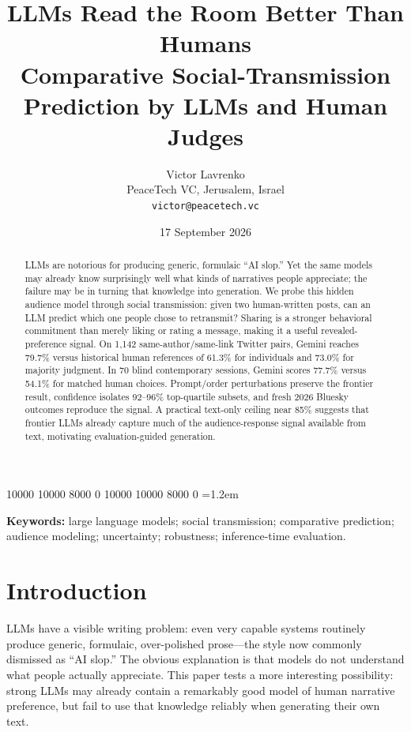 \documentclass[10pt,twocolumn]{article}
\title{\textbf{LLMs Read the Room Better Than Humans}\\\large Comparative Social-Transmission Prediction by LLMs and Human Judges}
\author{Victor Lavrenko\\
\small PeaceTech VC, Jerusalem, Israel\\
\small \texttt{victor@peacetech.vc}}
\date{17 September 2026}
\begin{document}
\raggedbottom
{} 10000 10000 8000 0
 10000 10000 8000 0
\emergencystretch=1.2em
\setlength{\textfloatsep}{7pt plus 2pt minus 2pt}
\setlength{\floatsep}{6pt plus 2pt minus 2pt}
\setlength{\intextsep}{6pt plus 2pt minus 2pt}
\maketitle

\begin{abstract}
LLMs are notorious for producing generic, formulaic ``AI slop.'' Yet the same models may already know surprisingly well what kinds of narratives people appreciate; the failure may be in turning that knowledge into generation. We probe this hidden audience model through social transmission: given two human-written posts, can an LLM predict which one people chose to retransmit? Sharing is a stronger behavioral commitment than merely liking or rating a message, making it a useful revealed-preference signal. On 1,142 same-author/same-link Twitter pairs, Gemini reaches 79.7\% versus historical human references of 61.3\% for individuals and 73.0\% for majority judgment. In 70 blind contemporary sessions, Gemini scores 77.7\% versus 54.1\% for matched human choices. Prompt/order perturbations preserve the frontier result, confidence isolates 92--96\% top-quartile subsets, and fresh 2026 Bluesky outcomes reproduce the signal. A practical text-only ceiling near 85\% suggests that frontier LLMs already capture much of the audience-response signal available from text, motivating evaluation-guided generation.
\end{abstract}

\noindent\textbf{Keywords:} large language models; social transmission; comparative prediction; audience modeling; uncertainty; robustness; inference-time evaluation.
\vspace{0.7em}

\section{Introduction}
LLMs have a visible writing problem: even very capable systems routinely produce generic, formulaic, over-polished prose---the style now commonly dismissed as ``AI slop.'' The obvious explanation is that models do not understand what people actually appreciate. This paper tests a more interesting possibility: strong LLMs may already contain a remarkably good model of human narrative preference, but fail to use that knowledge reliably when generating their own text.
\end{document}
